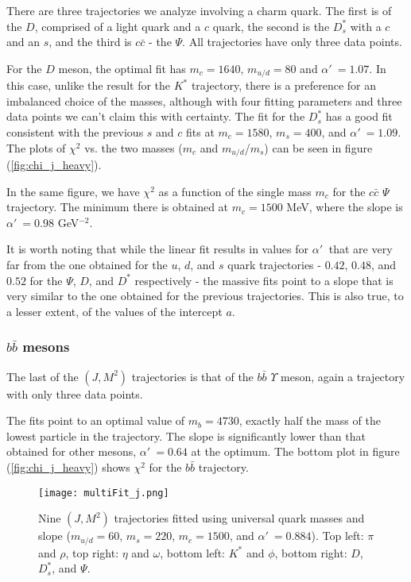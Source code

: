 \documentclass[11pt,a4]{article}
\newcommand{\alp}{\ensuremath{\alpha'\:}}
\newcommand{\ccb}{c\bar{c}}
\newcommand{\bbb}{b\bar{b}}
\newcommand{\mud}{m_{u/d}}
\begin{document}
			There are three trajectories we analyze involving a charm quark. The first is of the \(D\), comprised of a light quark and a \(c\) quark, the second is the \(D^*_s\) with a \(c\) and an \(s\), and the third is \(\ccb\) - the \(\Psi\). All trajectories have only three data points.
			
			For the \(D\) meson, the optimal fit has \(m_c = 1640\), \(\mud = 80\) and \(\alp = 1.07\). In this case, unlike the result for the \(K^*\) trajectory, there is a preference for an imbalanced choice of the masses, although with four fitting parameters and three data points we can't claim this with certainty. The fit for the \(D^*_s\) has a good fit consistent with the previous \(s\) and \(c\) fits at \(m_c = 1580\), \(m_s = 400\), and \(\alp = 1.09\). The plots of \(\chi^2\) vs. the two masses (\(m_c\) and \(\mud\)/\(m_s\)) can be seen in figure (\ref{fig:chi_j_heavy}).
			
			In the same figure, we have \(\chi^2\) as a function of the single mass \(m_c\) for the \(\ccb\) \(\Psi\) trajectory. The minimum there is obtained at \(m_c = 1500\) MeV, where the slope is \(\alp = 0.98\) GeV\(^{-2}\).
			
			It is worth noting that while the linear fit results in values for \(\alp\) that are very far from the one obtained for the \(u\), \(d\), and \(s\) quark trajectories - \(0.42\), \(0.48\), and \(0.52\) for the \(\Psi\), \(D\), and \(D^*\) respectively - the massive fits point to a slope that is very similar to the one obtained for the previous trajectories.	This is also true, to a lesser extent, of the values of the intercept \(a\).
		
	\subsubsection{\texorpdfstring{$\bbb$}{b-bbar} mesons}
		The last of the \((J,M^2)\) trajectories is that of the \(\bbb\) \(\Upsilon\) meson, again a trajectory with only three data points.

		The fits point to an optimal value of \(m_b = 4730\), exactly half the mass of the lowest particle in the trajectory. The slope is significantly lower than that obtained for other mesons, \(\alp = 0.64\) at the optimum. The bottom plot in figure (\ref{fig:chi_j_heavy}) shows \(\chi^2\) for the \(\bbb\) trajectory.
		
		\begin{figure}[t!] \centering
					\texttt{[image: multiFit\_j.png]}
					\caption{\label{fig:multiFit_j} Nine \((J,M^2)\) trajectories fitted using universal quark masses and slope (\(\mud = 60\), \(m_s = 220\), \(m_c = 1500\), and \(\alp = 0.884\)). Top left: \(\pi\) and \(\rho\), top right: \(\eta\) and \(\omega\), bottom left: \(K^*\) and \(\phi\), bottom right: \(D\), \(D^*_s\), and \(\Psi\).}
				\end{figure}
		
\end{document}
